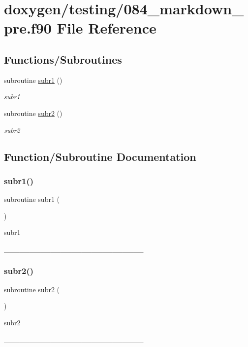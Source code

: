 \hypertarget{084__markdown__pre_8f90}{}\section{doxygen/testing/084\+\_\+markdown\+\_\+pre.f90 File Reference}
\label{084__markdown__pre_8f90}
\subsection*{Functions/\+Subroutines}
\begin{DoxyCompactItemize}
\item 
subroutine \mbox{\hyperlink{084__markdown__pre_8f90_aae79d7941f2dce9b2d61fc852f3031d1}{subr1}} ()
\begin{DoxyCompactList}\small\item\em subr1 \end{DoxyCompactList}\item 
subroutine \mbox{\hyperlink{084__markdown__pre_8f90_a799d06e535f6b6e83331907261cef116}{subr2}} ()
\begin{DoxyCompactList}\small\item\em subr2 \end{DoxyCompactList}\end{DoxyCompactItemize}


\subsection{Function/\+Subroutine Documentation}
\mbox{\label{084__markdown__pre_8f90_aae79d7941f2dce9b2d61fc852f3031d1}} 
\subsubsection{\texorpdfstring{subr1()}{subr1()}}
{\footnotesize\ttfamily subroutine subr1 (\begin{DoxyParamCaption}{ }\end{DoxyParamCaption})}



subr1 


\begin{DoxyPre}
                     \_\_\_\_\_\_\_\_\_\_\_\_\_\_\_\_\_\_\_\_\_\_\_\_\_\_\_
\end{DoxyPre}
 \mbox{\label{084__markdown__pre_8f90_a799d06e535f6b6e83331907261cef116}} 
\subsubsection{\texorpdfstring{subr2()}{subr2()}}
{\footnotesize\ttfamily subroutine subr2 (\begin{DoxyParamCaption}{ }\end{DoxyParamCaption})}



subr2 


\begin{DoxyPre}
                     \_\_\_\_\_\_\_\_\_\_\_\_\_\_\_\_\_\_\_\_\_\_\_\_\_\_\_
\end{DoxyPre}
 